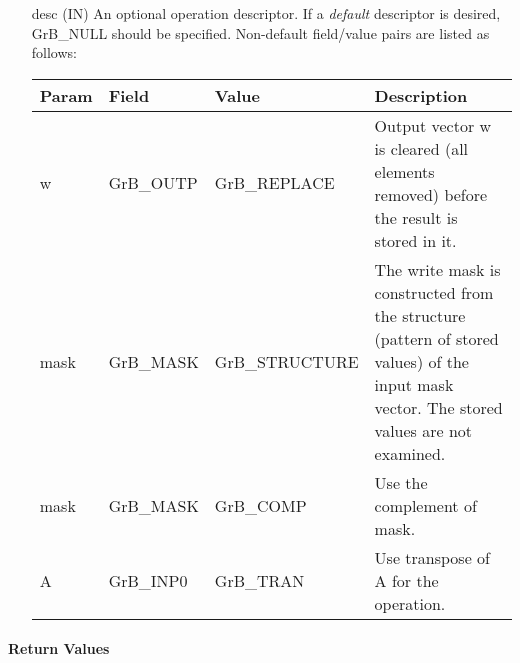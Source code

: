 \begin{itemize}[leftmargin=1.1in]
    \item[{\sf desc}] ({\sf IN}) An optional operation descriptor. If
    a \emph{default} descriptor is desired, {\sf GrB\_NULL} should be
    specified. Non-default field/value pairs are listed as follows:  \\

    \hspace*{-2em}\begin{tabular}{lllp{2.7in}}
        Param & Field  & Value & Description \\
        \hline
        {\sf w}    & {\sf GrB\_OUTP} & {\sf GrB\_REPLACE} & Output vector {\sf w}
        is cleared (all elements removed) before the result is stored in it.\\

        {\sf mask} & {\sf GrB\_MASK} & {\sf GrB\_STRUCTURE}   & The write mask is
        constructed from the structure (pattern of stored values) of the input
        {\sf mask} vector. The stored values are not examined.\\

        {\sf mask} & {\sf GrB\_MASK} & {\sf GrB\_COMP}   & Use the 
        complement of {\sf mask}. \\

        {\sf A}    & {\sf GrB\_INP0} & {\sf GrB\_TRAN}   & Use transpose of {\sf A}
        for the operation. \\
    \end{tabular}
\end{itemize}

\paragraph{Return Values}

